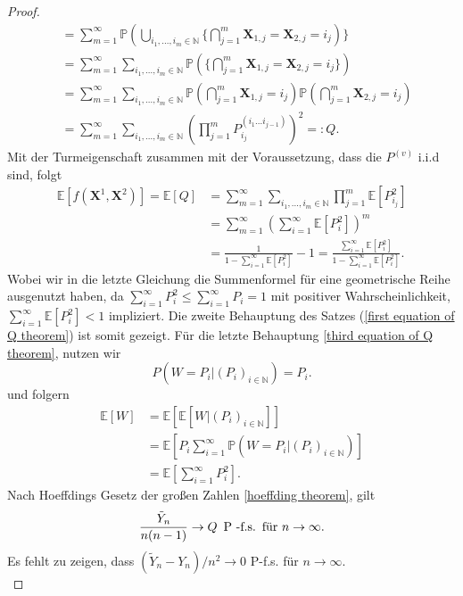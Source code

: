\begin{proof}
\begin{align}
&=\sum_{m=1}^{\infty}\mathbb{P}(\bigcup_{i_1,...,i_m \in \mathbb{N}} \{\bigcap_{j=1}^{m}\textbf{X}_{1,j}=\textbf{X}_{2,j} = i_j) \}   \nonumber\\
&=\sum_{m=1}^{\infty}\sum_{i_1,...,i_m \in \mathbb{N}}\mathbb{P}(\{\bigcap_{j=1}^{m}\textbf{X}_{1,j}=\textbf{X}_{2,j} = i_j \}) \nonumber\\
&=\sum_{m=1}^{\infty}\sum_{i_1,...,i_m \in \mathbb{N}}\mathbb{P}(\bigcap_{j=1}^{m}\textbf{X}_{1,j} = i_j )\mathbb{P}(\bigcap_{j=1}^{m}\textbf{X}_{2,j} = i_j ) \nonumber\\
&=\sum_{m=1}^{\infty}\sum_{i_1,...,i_m \in \mathbb{N}}(\prod_{j=1}^{m}P_{i_j}^{(i_1...i_{j-1})})^2 =: Q \label{Gleichungskette Tiefe}.
\end{align}
Mit der Turmeigenschaft zusammen mit der Voraussetzung, dass die $P^{(v)}$ i.i.d sind, folgt 
\begin{align}
\mathbb{E}[f(\textbf{X}^1,\textbf{X}^2) ] = \mathbb{E}[Q] &=\sum_{m=1}^{\infty}\sum_{i_1,...,i_m \in \mathbb{N}}\prod_{j=1}^{m}\mathbb{E}[P_{i_j}^{2}] \nonumber\\
 &= \sum_{m=1}^{\infty}(\sum_{i =1}^{\infty}\mathbb{E}[P_{i}^{2}])^m \nonumber \\
 &= \frac{1}{1- \sum_{i=1}^{\infty}\mathbb{E}[P_i^2]}-1  = \frac{\sum_{i=1}^{\infty}\mathbb{E}[P_i^2]}{1- \sum_{i=1}^{\infty}\mathbb{E}[P_i^2]}  \nonumber.
\end{align}
Wobei wir in die letzte Gleichung die Summenformel für eine geometrische Reihe ausgenutzt haben, da $\sum_{i=1}^{\infty} P_i^2 \leq \sum_{i=1}^{\infty} P_i = 1$ mit positiver Wahrscheinlichkeit, $\sum_{i=1}^{\infty} \mathbb{E}[P_i^2] < 1$ impliziert. Die zweite Behauptung des Satzes (\ref{first equation of Q theorem}) ist somit gezeigt. Für die letzte Behauptung \ref{third equation of Q theorem}, nutzen wir 
\[
    P(W=P_i|(P_i)_{i \in \mathbb{N}}) = P_i.  
\]  
und folgern
\begin{align}
\mathbb{E}[W] &= \mathbb{E}[\mathbb{E}[W|(P_i)_{i \in \mathbb{N}}]] \\
&= \mathbb{E}[P_i\sum_{i=1}^{\infty}\mathbb{P}(W = P_i|(P_i)_{i \in \mathbb{N}})] \\
&= \mathbb{E}[\sum_{i=1}^{\infty}P_i^2].
\end{align}
Nach Hoeffdings Gesetz der großen Zahlen \ref{hoeffding theorem}, gilt
\[
    \frac{\tilde{Y}_n}{n(n-1)} \rightarrow Q \hspace{5pt} \textnormal{P -f.s.} \hspace{5pt} \textnormal{für } n \to \infty.
\]
Es fehlt zu zeigen, dass $(\tilde{Y}_n-Y_n)/n^2 \rightarrow 0 $ P-f.s. für $n \to \infty$. \\

\end{proof}
